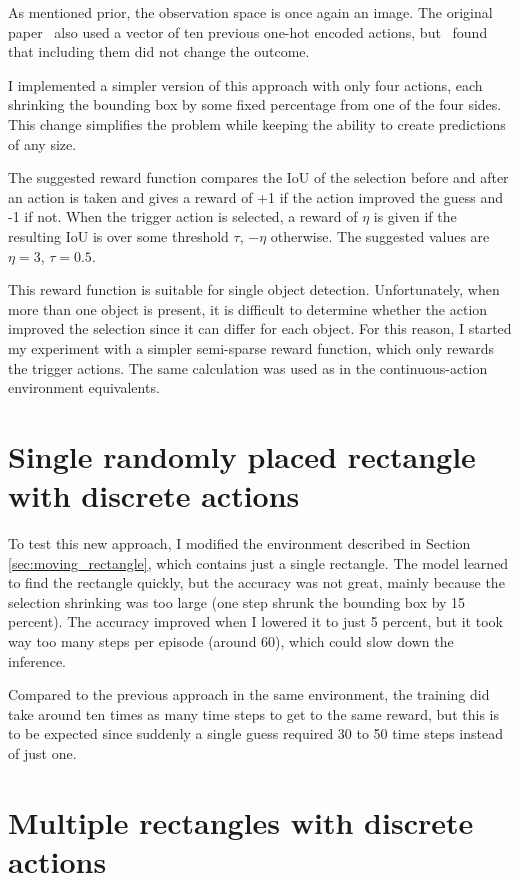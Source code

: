 \documentclass[
  digital,     %
  oneside,     %
  nosansbold,  %
  nocolorbold, %
  lof,         %
  lot,         %
]{fithesis4}
\begin{document}
As mentioned prior, the observation space is once again an image. The original paper~\cite{iterative_od_with_rl} also used a vector of ten previous one-hot encoded actions, but~\cite{rl_object_detection} found that including them did not change the outcome.

I implemented a simpler version of this approach with only four actions, each shrinking the bounding box by some fixed percentage from one of the four sides. This change simplifies the problem while keeping the ability to create predictions of any size.

The suggested reward function compares the IoU of the selection before and after an action is taken and gives a reward of +1 if the action improved the guess and -1 if not. When the trigger action is selected, a reward of $\eta$ is given if the resulting IoU is over some threshold $\tau$, $-\eta$ otherwise. The suggested values are $\eta=3$, $\tau=0.5$.

This reward function is suitable for single object detection. Unfortunately, when more than one object is present, it is difficult to determine whether the action improved the selection since it can differ for each object. For this reason, I started my experiment with a simpler semi-sparse reward function, which only rewards the trigger actions. The same calculation was used as in the continuous-action environment equivalents.

\section{Single randomly placed rectangle with discrete actions}

To test this new approach, I modified the environment described in Section \ref{sec:moving_rectangle}, which contains just a single rectangle. The model learned to find the rectangle quickly, but the accuracy was not great, mainly because the selection shrinking was too large (one step shrunk the bounding box by 15 percent). The accuracy improved when I lowered it to just 5 percent, but it took way too many steps per episode (around 60), which could slow down the inference.

Compared to the previous approach in the same environment, the training did take around ten times as many time steps to get to the same reward, but this is to be expected since suddenly a single guess required 30 to 50 time steps instead of just one.

\section{Multiple rectangles with discrete actions}
\end{document}
